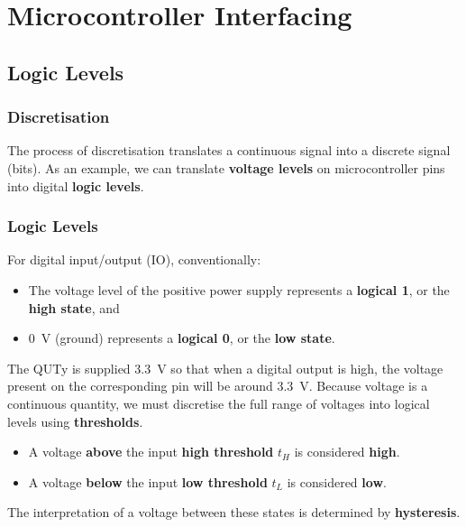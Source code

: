 \documentclass{report}
\begin{document}
\chapter{Microcontroller Interfacing}
\section{Logic Levels}
\subsection{Discretisation}
The process of discretisation translates a continuous signal into a discrete signal (bits).
As an example, we can translate \textbf{voltage levels} on microcontroller pins into digital \textbf{logic levels}.
\subsection{Logic Levels}
For digital input/output (IO), conventionally:
\begin{itemize}
    \item The voltage level of the positive power supply represents a \textbf{logical 1}, or the \textbf{high state}, and
    \item \qty{0}{V} (ground) represents a \textbf{logical 0}, or the \textbf{low state}.
\end{itemize}
The QUTy is supplied \qty{3.3}{V} so that when a digital output is high,
the voltage present on the corresponding pin will be around \qty{3.3}{V}.
Because voltage is a continuous quantity, we must discretise the full range of voltages into logical levels using \textbf{thresholds}.
\begin{itemize}
    \item A voltage \textbf{above} the input \textbf{high threshold} \(t_H\) is considered \textbf{high}.
    \item A voltage \textbf{below} the input \textbf{low threshold} \(t_L\) is considered \textbf{low}.
\end{itemize}
The interpretation of a voltage between these states is determined by \textbf{hysteresis}.
\end{document}
